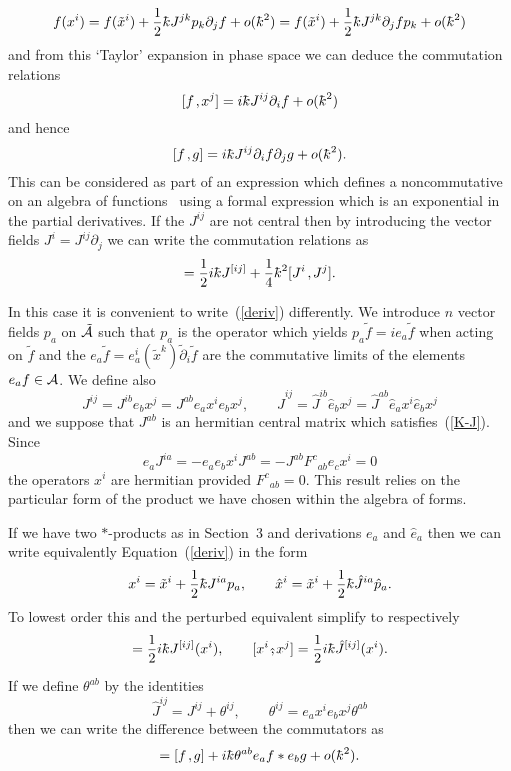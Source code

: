 \documentclass[a4paper,12pt]{article}
\def\h#1{\hat #1}
\def\t#1{\tilde #1}
\def\c#1{{\cal #1}}
\def\kbar{{\mathchar'26\mkern-9muk}}
\def\t#1{\tilde #1}
\def\wm{\mathbin{*}}
\def\k{\kern-.1em\mathbin{,}\kern-.1em}
\def\hk{\kern.12em\raise-1em\hbox{$\hat{\raise1em\hbox{,}}$}\kern.12em}
\begin{document}
$$
f(x^i) = f(\t{x}^i) + \frac 12 \kbar J^{jk} p_k \partial_j f +
o(\kbar^2) = f(\t{x}^i) + \frac 12 \kbar J^{jk} \partial_j f p_k +
o(\kbar^2)
$$
and from this `Taylor' expansion in phase space we can deduce the
commutation relations
$$
[f \k x^j] = i \kbar J^{ij} \partial_i f + o(\kbar^2)
$$
and hence
$$
[f \k g] = i \kbar J^{ij} \partial_i f \partial_j g + o(\kbar^2).
$$
This can be considered as part of an expression which defines a
noncommutative  on an algebra of
functions~\cite{Wey50,Moy49} using a formal expression which is an
exponential in the partial derivatives.  If the $J^{ij}$ are not
central then by introducing the vector fields $J^i = J^{ij}
\partial_j$ we can write the commutation relations as
\begin{equation}
[x^i \k  x^j] = \frac 12 i \kbar J^{[ij]} + 
\frac 14 \kbar^2 [J^i \k J^j].                                 \label{rep}
\end{equation}

In this case it is convenient to write~(\ref{deriv}) differently.  We
introduce $n$ vector fields $p_a$ on $\t{\c{A}}$ such that $p_a$ is
the operator which yields $p_a \t{f} = i e_a \t{f}$ when acting on
$\t{f}$ and the $e_a \t{f} = e^i_a(\t{x}^k) \t{\partial}_i \t{f}$ are
the commutative limits of the elements $e_a f \in \c{A}$. We define
also
$$
J^{ij} = J^{ib} e_b x^j = J^{ab} e_a x^i e_b x^j, \qquad
\h{J}^{ij} = \h{J}^{ib} \h{e}_b x^j = 
\h{J}^{ab} \h{e}_a x^i \h{e}_b x^j
$$
and we suppose that $J^{ab}$ is an hermitian central matrix which
satisfies~(\ref{K-J}). Since
$$
e_a J^{ia} = - e_a e_b x^i J^{ab} = - J^{ab} F^c{}_{ab} e_c x^i = 0
$$
the operators $x^i$ are hermitian provided $F^c{}_{ab} = 0$.  This
result relies on the particular form of the product we have chosen
within the algebra of forms.  

If we have two $*$-products as in Section~3 and derivations $e_a$
and $\h{e}_a$ then we can write equivalently Equation~(\ref{deriv})
in the form
\begin{equation}
x^i = \t{x}^i +\frac 12 \kbar J^{ia} p_a, \qquad
\h{x}^i = \t{x}^i +\frac 12 \kbar \h{J}^{ia} \h{p}_a.         \label{eq:1}
\end{equation}
To lowest order this and the perturbed equivalent simplify to respectively
\begin{equation}
[x^i \k x^j] = \frac 12 i \kbar J^{[ij]}(x^i), \qquad
[x^i \hk x^j] = \frac 12 i \kbar \h{J}^{[ij]}(x^i).           \label{s-rep}
\end{equation}
If we define $\theta^{ab}$ by the identities
$$
\h{J}^{ij} = J^{ij} + \theta^{ij}, \qquad 
\theta^{ij} = e_a x^i e_b x^j  \theta^{ab}
$$
then we can write the difference between the commutators as
\begin{equation}
[f \hk g] = [f \k g] + i \kbar  \theta^{ab} e_a f \wm e_b g +  
o(\kbar^2).                                                    \label{W-M}
\end{equation}
\end{document}
